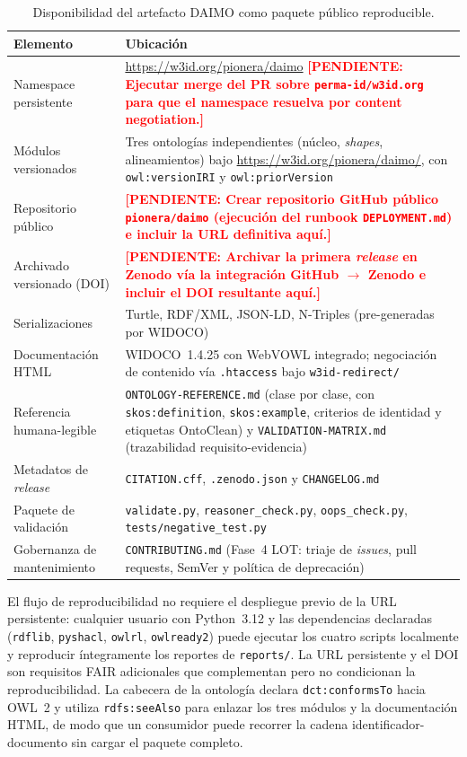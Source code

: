 \documentclass[11pt,a4paper]{article}
\newcommand{\code}[1]{\texttt{#1}}
\newcommand{\TODO}[1]{\textcolor{red}{\textbf{[PENDIENTE: #1]}}}
\begin{document}
\begin{table}[t]
\caption{Disponibilidad del artefacto DAIMO como paquete público reproducible.}
\label{tab:avail}
\centering
\small
\begin{tabularx}{\textwidth}{@{}L{4.5cm}X@{}}
\toprule
\textbf{Elemento} & \textbf{Ubicación} \\
\midrule
Namespace persistente & \url{https://w3id.org/pionera/daimo} \TODO{Ejecutar merge del PR sobre \texttt{perma-id/w3id.org} para que el namespace resuelva por content negotiation.} \\[0.3em]
Módulos versionados & Tres ontologías independientes (núcleo, \emph{shapes}, alineamientos) bajo \url{https://w3id.org/pionera/daimo/}, con \code{owl:versionIRI} y \code{owl:priorVersion} \\[0.3em]
Repositorio público & \TODO{Crear repositorio GitHub público \texttt{pionera/daimo} (ejecución del runbook \texttt{DEPLOYMENT.md}) e incluir la URL definitiva aquí.} \\[0.3em]
Archivado versionado (DOI) & \TODO{Archivar la primera \emph{release} en Zenodo vía la integración GitHub $\to$ Zenodo e incluir el DOI resultante aquí.} \\[0.3em]
Serializaciones & Turtle, RDF/XML, JSON-LD, N-Triples (pre-generadas por WIDOCO) \\[0.3em]
Documentación HTML & WIDOCO~1.4.25 con WebVOWL integrado; negociación de contenido vía \code{.htaccess} bajo \code{w3id-redirect/} \\[0.3em]
Referencia humana-legible & \code{ONTOLOGY-REFERENCE.md} (clase por clase, con \code{skos:definition}, \code{skos:example}, criterios de identidad y etiquetas OntoClean) y \code{VALIDATION-MATRIX.md} (trazabilidad requisito-evidencia) \\[0.3em]
Metadatos de \emph{release} & \code{CITATION.cff}, \code{.zenodo.json} y \code{CHANGELOG.md} \\[0.3em]
Paquete de validación & \code{validate.py}, \code{reasoner\_check.py}, \code{oops\_check.py}, \code{tests/negative\_test.py} \\[0.3em]
Gobernanza de mantenimiento & \code{CONTRIBUTING.md} (Fase~4 LOT: triaje de \emph{issues}, pull requests, SemVer y política de deprecación) \\
\bottomrule
\end{tabularx}
\end{table}

El flujo de reproducibilidad no requiere el despliegue previo de la URL persistente: cualquier usuario con Python~3.12 y las dependencias declaradas (\code{rdflib}, \code{pyshacl}, \code{owlrl}, \code{owlready2}) puede ejecutar los cuatro scripts localmente y reproducir íntegramente los reportes de \code{reports/}. La URL persistente y el DOI son requisitos FAIR adicionales que complementan pero no condicionan la reproducibilidad. La cabecera de la ontología declara \code{dct:conformsTo} hacia OWL~2 y utiliza \code{rdfs:seeAlso} para enlazar los tres módulos y la documentación HTML, de modo que un consumidor puede recorrer la cadena identificador-documento sin cargar el paquete completo.
\end{document}
